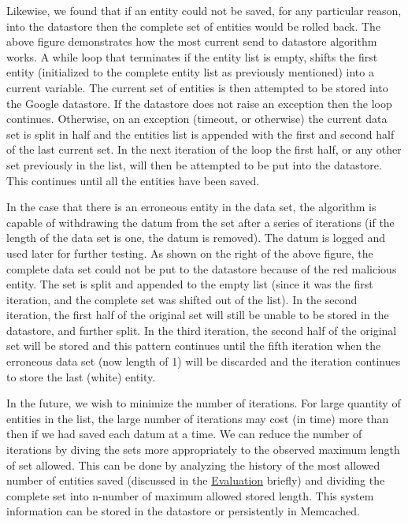 \documentclass[10pt,a4paper,english]{article}
\begin{document}
Likewise, we found that if an entity could not be saved, for any particular reason, into the datastore then the complete set of entities would be rolled back. The above figure demonstrates how the most current send to datastore algorithm works. A while loop that terminates if the entity list is empty, shifts the first entity (initialized to the complete entity list as previously mentioned) into a current variable. The current set of entities is then attempted to be stored into the Google datastore. If the datastore does not raise an exception then the loop continues. Otherwise, on an exception (timeout, or otherwise) the current data set is split in half and the entities list is appended with the first and second half of the last current set. In the next iteration of the loop the first half, or any other set previously in the list, will then be attempted to be put into the datastore. This continues until all the entities have been saved.

In the case that there is an erroneous entity in the data set, the algorithm is capable of withdrawing the datum from the set after a series of iterations (if the length of the data set is one, the datum is removed). The datum is logged and used later for further testing. As shown on the right of the above figure, the complete data set could not be put to the datastore because of the red malicious entity. The set is split and appended to the empty list (since it was the first iteration, and the complete set was shifted out of the list). In the second iteration, the first half of the original set will still be unable to be stored in the datastore, and further split. In the third iteration, the second half of the original set will be stored and this pattern continues until the fifth iteration when the erroneous data set (now length of 1) will be discarded and the iteration continues to store the last (white) entity.

In the future, we wish to minimize the number of iterations. For large quantity of entities in the list, the large number of iterations may cost (in time) more than then if we had saved each datum at a time. We can reduce the number of iterations by diving the sets more appropriately to the observed maximum length of set allowed. This can be done by analyzing the history of the most allowed number of entities saved (discussed in the \href{\#evaluation}{Evaluation} briefly) and dividing the complete set into n-number of maximum allowed stored length. This system information can be stored in the datastore or persistently in Memcached.
\end{document}
